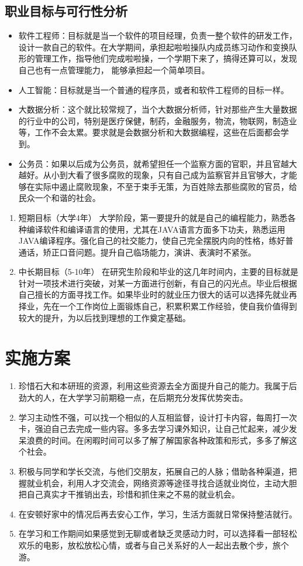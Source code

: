 \documentclass{article}
\begin{document}
\subsection{职业目标与可行性分析}
\begin{itemize}
	\item 软件工程师：目标就是当一个软件的项目经理，负责一整个软件的研发工作，设计一款自己的软件。在大学期间，承担起啦啦操队内成员练习动作和变换队形的管理工作，指导他们完成啦啦操，一个学期下来了，搞得还算可以，发现自己也有一点管理能力， 能够承担起一个简单项目。
	\item 人工智能：目标就是当一个普通的程序员，或者和软件工程师的目标一样。
	\item 大数据分析：这个就比较常规了，当个大数据分析师，针对那些产生大量数据的行业中的公司，特别是医疗保健，制药，金融服务，物流，物联网，制造业等，工作不会太累。要求就是会数据分析和大数据编程，这些在后面都会学到。
	\item 公务员：如果以后成为公务员，就希望担任一个监察方面的官职，并且官越大越好。从小到大看了很多腐败的现象，只有自己成为监察官并且官够大，才能够在实际中遏止腐败现象，不至于束手无策，为百姓除去那些腐败的官员，给民众一个和谐的社会。
\end{itemize}
\begin{enumerate}[(1)]
	\item 短期目标（大学4年）
	 大学阶段，第一要提升的就是自己的编程能力，熟悉各种编译软件和编译语言的使用，尤其在JAVA语言方面多下功夫，熟悉运用JAVA编译程序。强化自己的社交能力，使自己完全摆脱内向的性格，练好普通话，矫正口音问题。提升自己临场能力，演讲、表演时不紧张。
	\item 中长期目标（5-10年）
	在研究生阶段和毕业的这几年时间内，主要的目标就是针对一项技术进行突破，对某一方面进行创新，有自己的闪光点。毕业后根据自己擅长的方面寻找工作。如果毕业时的就业压力很大的话可以选择先就业再择业，先在一个工作岗位上面锻炼自己，积累积累工作经验，使自我价值得到较大的提升，为以后找到理想的工作奠定基础。
\end{enumerate}

\section{实施方案}
\begin{enumerate}[1、]
	\item 珍惜石大和本研班的资源，利用这些资源去全方面提升自己的能力。我属于后劲大的人，在大学学习前期稳一点，在后期充分发挥优势突击。
	\item 学习主动性不强，可以找一个相似的人互相监督，设计打卡内容，每周打一次卡，强迫自己去完成一些内容。多多去学习课外知识，让自己忙起来，减少发呆浪费的时间。在闲暇时间可以多了解了解国家各种政策和形式，多多了解这个社会。
	\item 积极与同学和学长交流，与他们交朋友，拓展自己的人脉；借助各种渠道，把握就业机会，利用人才交流会，网络资源等途径寻找合适就业岗位，主动大胆把自己真实才干推销出去，珍惜和抓住来之不易的就业机会。
	\item 在安顿好家中的情况后再去安心工作，学习，生活方面就日常保持整洁就行。
	\item 在学习和工作期间如果感觉到无聊或者缺乏灵感动力时，可以选择看一部轻松欢乐的电影，放松放松心情，或者与自己关系好的人一起出去散个步，旅个游。
\end{enumerate}
\end{document}
